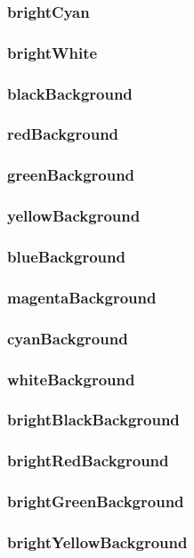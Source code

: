 \documentclass[10pt,a4paper]{report}
\begin{document}
			\subsubsection{brightCyan}
			\subsubsection{brightWhite}
			\subsubsection{blackBackground}
			\subsubsection{redBackground}
			\subsubsection{greenBackground}
			\subsubsection{yellowBackground}
			\subsubsection{blueBackground}
			\subsubsection{magentaBackground}
			\subsubsection{cyanBackground}
			\subsubsection{whiteBackground}
			\subsubsection{brightBlackBackground}
			\subsubsection{brightRedBackground}
			\subsubsection{brightGreenBackground}
			\subsubsection{brightYellowBackground}
		\pagebreak
\end{document}
